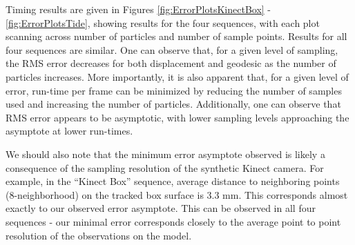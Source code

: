 Timing results are given in Figures \ref{fig:ErrorPlotsKinectBox} -\ref{fig:ErrorPlotsTide}, showing results for the four sequences, with each plot scanning across number of particles and number of sample points. Results for all four sequences are similar. One can observe that, for a given level of sampling, the RMS error decreases for both displacement and geodesic as the number of particles increases. More importantly, it is also apparent that, for a given level of error, run-time per frame can be minimized by reducing the number of samples used and increasing the number of particles. Additionally, one can observe that RMS error appears to be asymptotic, with lower sampling levels approaching the asymptote at lower run-times.

We should also note that the minimum error asymptote observed is likely a consequence of the sampling resolution of the synthetic Kinect camera. For example, in the ``Kinect Box'' sequence, average distance to neighboring points (8-neighborhood) on the tracked box surface is 3.3 mm. This corresponds almost exactly to our observed error asymptote. This can be observed in all four sequences - our minimal error corresponds closely to the average point to point resolution of the observations on the model. 




